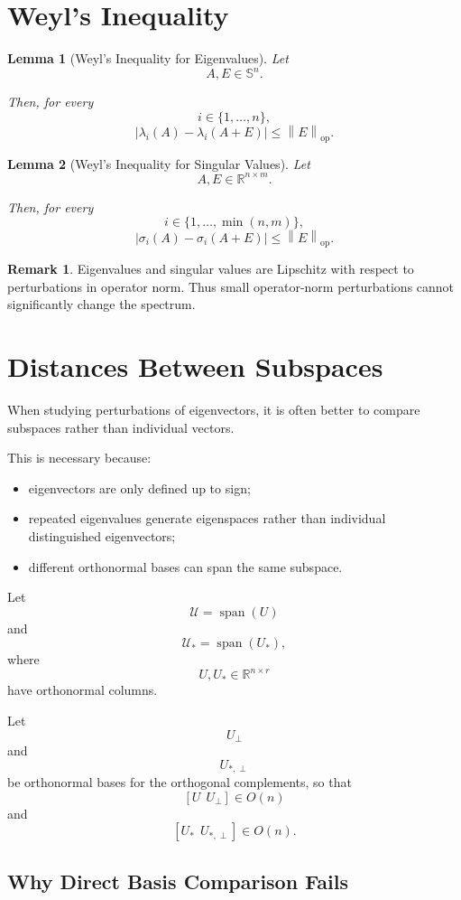 \documentclass[12pt,oneside]{book}
\numberwithin{equation}{section}
\theoremstyle{definition}
\newtheorem{remark}{Remark}[section]
\theoremstyle{plain}
\newtheorem{lemma}{Lemma}[section]
\theoremstyle{remark}
\newcommand{\R}{\mathbb{R}}
\newcommand{\norm}[1]{\left\lVert #1 \right\rVert}
\begin{document}
\section{Weyl's Inequality}

\begin{lemma}[Weyl's Inequality for Eigenvalues]
Let
\[
A,E\in\mathbb{S}^n.
\]

Then, for every
\[
i\in\{1,\dots,n\},
\]
\[
|\lambda_i(A)-\lambda_i(A+E)|
\leq
\norm{E}_{\mathrm{op}}.
\]
\end{lemma}

\begin{lemma}[Weyl's Inequality for Singular Values]
Let
\[
A,E\in\R^{n\times m}.
\]

Then, for every
\[
i\in\{1,\dots,\min(n,m)\},
\]
\[
|\sigma_i(A)-\sigma_i(A+E)|
\leq
\norm{E}_{\mathrm{op}}.
\]
\end{lemma}

\begin{remark}
Eigenvalues and singular values are Lipschitz with respect to perturbations in operator norm. Thus small operator-norm perturbations cannot significantly change the spectrum.
\end{remark}

\section{Distances Between Subspaces}

When studying perturbations of eigenvectors, it is often better to compare subspaces rather than individual vectors.

This is necessary because:
\begin{itemize}
\item eigenvectors are only defined up to sign;
\item repeated eigenvalues generate eigenspaces rather than individual distinguished eigenvectors;
\item different orthonormal bases can span the same subspace.
\end{itemize}

Let
\[
\mathcal{U}
=
\operatorname{span}(U)
\]
and
\[
\mathcal{U}_*
=
\operatorname{span}(U_*),
\]
where
\[
U,U_*\in\R^{n\times r}
\]
have orthonormal columns.

Let
\[
U_\perp
\]
and
\[
U_{*,\perp}
\]
be orthonormal bases for the orthogonal complements, so that
\[
[U\ \ U_\perp]\in O(n)
\]
and
\[
[U_*\ \ U_{*,\perp}]\in O(n).
\]

\subsection{Why Direct Basis Comparison Fails}
\end{document}
